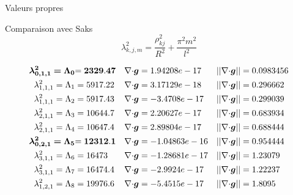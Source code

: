 \documentclass{beamer}
\renewcommand{\div}{{\nabla\cdot}}
\begin{document}
\begin{frame}{Valeurs propres}
\begin{block}{Comparaison avec Saks}
\[
\lambda^2_{k,j,m} = \frac{\rho_{kj}^2}{R^2}+\frac{\pi^2m^2}{l^2}
\]
\end{block}
\begin{align*}
\bm{\lambda^2_{0,1,1}=\Lambda_0} &\bf{= 2329.47}	&\div\bm{g} &= 1.94208e-17	&||\div\bm{g}|| &= 0.0983456\\
\lambda^2_{1,1,1}=\Lambda_1 &= 5917.22	&\div\bm{g} &= 3.17129e-18	&||\div\bm{g}|| &= 0.296662\\
\lambda^2_{1,1,1}=\Lambda_2 &= 5917.43	&\div\bm{g} &= -3.4708e-17	&||\div\bm{g}|| &= 0.299039\\
\lambda^2_{2,1,1}=\Lambda_3 &= 10644.7	&\div\bm{g} &= 2.20627e-17	&||\div\bm{g}|| &= 0.683934\\
\lambda^2_{2,1,1}=\Lambda_4 &= 10647.4	&\div\bm{g} &= 2.89804e-17	&||\div\bm{g}|| &= 0.688444\\
\bm{\lambda^2_{0,2,1}=\Lambda_5} &\bf{= 12312.1}	&\div\bm{g} &= -1.04863e-16	&||\div\bm{g}|| &= 0.954444\\
\lambda^2_{3,1,1}=\Lambda_6 &= 16473	&\div\bm{g} &= -1.28681e-17	&||\div\bm{g}|| &= 1.23079\\
\lambda^2_{3,1,1}=\Lambda_7 &= 16474.4	&\div\bm{g} &= -2.9924e-17	&||\div\bm{g}|| &= 1.22237\\
\lambda^2_{1,2,1}=\Lambda_8 &= 19976.6	&\div\bm{g} &= -5.4515e-17	&||\div\bm{g}|| &= 1.8095
\end{align*}
\end{frame}
\end{document}
